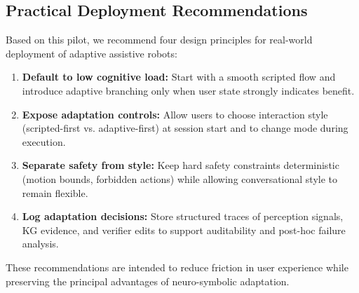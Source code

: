 \subsection{Practical Deployment Recommendations}

Based on this pilot, we recommend four design principles for real-world deployment of adaptive assistive robots:

\begin{enumerate}
\item \textbf{Default to low cognitive load:} Start with a smooth scripted flow and introduce adaptive branching only when user state strongly indicates benefit.

\item \textbf{Expose adaptation controls:} Allow users to choose interaction style (scripted-first vs. adaptive-first) at session start and to change mode during execution.

\item \textbf{Separate safety from style:} Keep hard safety constraints deterministic (motion bounds, forbidden actions) while allowing conversational style to remain flexible.

\item \textbf{Log adaptation decisions:} Store structured traces of perception signals, KG evidence, and verifier edits to support auditability and post-hoc failure analysis.
\end{enumerate}

These recommendations are intended to reduce friction in user experience while preserving the principal advantages of neuro-symbolic adaptation.
